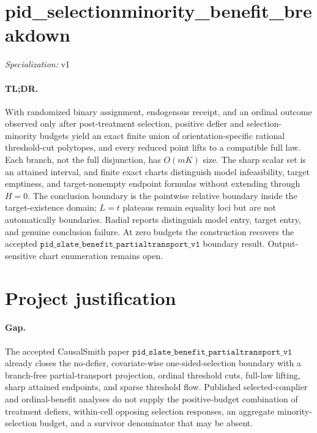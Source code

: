 \documentclass{article}
\begin{document}
\sloppy

\section*{pid\_\allowbreak{}selectionminority\_\allowbreak{}benefit\_\allowbreak{}breakdown}

\noindent\textit{Specialization:} v1\par

\paragraph{TL;DR.} With randomized binary assignment, endogenous receipt, and an ordinal outcome observed only after post-treatment selection, positive defier and selection-minority budgets yield an exact finite union of orientation-specific rational threshold-cut polytopes, and every reduced point lifts to a compatible full law. Each branch, not the full disjunction, has \(O(mK)\) size. The sharp scalar set is an attained interval, and finite exact charts distinguish model infeasibility, target emptiness, and target-nonempty endpoint formulas without extending through \(H=0\). The conclusion boundary is the pointwise relative boundary inside the target-existence domain; \(L=t\) plateaus remain equality loci but are not automatically boundaries. Radial reports distinguish model entry, target entry, and genuine conclusion failure. At zero budgets the construction recovers the accepted \(\texttt{pid\_slate\_benefit\_partialtransport\_v1}\) boundary result. Output-sensitive chart enumeration remains open.

\section{Project justification}

\paragraph{Gap.} The accepted CausalSmith paper \(\texttt{pid\_slate\_benefit\_partialtransport\_v1}\) already closes the no-defier, covariate-wise one-sided-selection boundary with a branch-free partial-transport projection, ordinal threshold cuts, full-law lifting, sharp attained endpoints, and sparse threshold flow. Published selected-complier and ordinal-benefit analyses do not supply the positive-budget combination of treatment defiers, within-cell opposing selection responses, an aggregate minority-selection budget, and a survivor denominator that may be absent.
\end{document}
